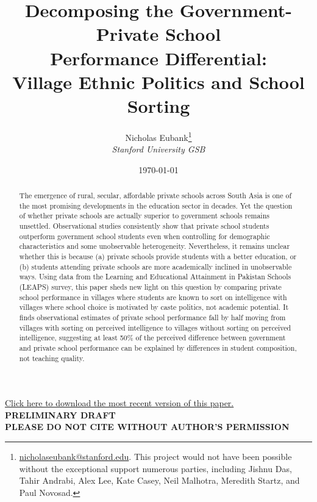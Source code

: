 \documentclass[11pt]{article}
\title{Decomposing the Government-Private School \\ Performance Differential: \\ Village Ethnic Politics and School Sorting}
\author{Nicholas Eubank\footnote{\href{mailto:nicholaseubank@stanford.edu}{nicholaseubank@stanford.edu}. This project would not have been possible without the exceptional support numerous parties, including Jishnu Das, Tahir Andrabi, Alex Lee, Kate Casey, Neil Malhotra, Meredith Startz, and Paul Novosad.} \\ \emph{Stanford University GSB}}
\date{\today}
\begin{document}
\maketitle
\begin{center}
\vspace{1.5cm}

{\Large \color{blue}\href{http://www.nickeubank.com/eubank_schoolsorting/}{Click here to download the most recent version of this paper.}\color{black}}
\vspace{1.5cm}\\

\textbf{PRELIMINARY DRAFT \\ PLEASE DO NOT CITE WITHOUT AUTHOR'S PERMISSION} \\
\end{center}

\vspace{0.5cm}

\begin{abstract}
The emergence of rural, secular, affordable private schools across South Asia is one of the most promising developments in the education sector in decades. Yet the question of whether private schools are actually superior to government schools remains unsettled. Observational studies consistently show that private school students outperform government school students even when controlling for demographic characteristics and some unobservable heterogeneity. Nevertheless, it remains unclear whether this is because (a) private schools provide students with a better education, or (b) students attending private schools are more academically inclined in unobservable ways. Using data from the Learning and Educational Attainment in Pakistan Schools (LEAPS) survey, this paper sheds new light on this question by comparing private school performance in villages where students are known to sort on intelligence with villages where school choice is motivated by caste politics, not academic potential. It finds observational estimates of private school performance fall by half moving from villages with sorting on perceived intelligence to villages without sorting on perceived intelligence, suggesting at least 50\% of the perceived difference between government and private school performance can be explained by differences in student composition, not teaching quality.
\end{abstract}

\thispagestyle{empty}



\pagebreak
\end{document}
